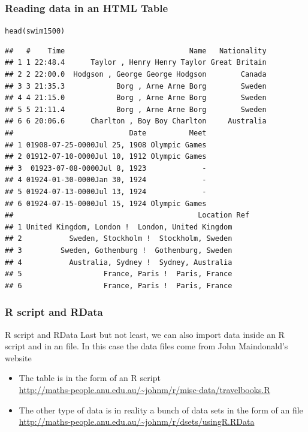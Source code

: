 \documentclass{beamer}\usepackage[]{graphicx}\usepackage[]{color}
\makeatletter
\newcommand{\hlstd}[1]{\textcolor[rgb]{0.196,0.196,0.196}{#1}}%
\newcommand{\hlkwd}[1]{\textcolor[rgb]{0.78,0.227,0.412}{#1}}%
\newenvironment{kframe}{%
 \def\at@end@of@kframe{}%
 \ifinner\ifhmode%
  \def\at@end@of@kframe{\end{minipage}}%
  \begin{minipage}{\columnwidth}%
 \fi\fi%
 \def\FrameCommand##1{\hskip\@totalleftmargin \hskip-\fboxsep
 \colorbox{shadecolor}{##1}\hskip-\fboxsep
     \hskip-\linewidth \hskip-\@totalleftmargin \hskip\columnwidth}%
 \MakeFramed {\advance\hsize-\width
   \@totalleftmargin\z@ \linewidth\hsize
   \@setminipage}}%
 {\par\unskip\endMakeFramed%
 \at@end@of@kframe}
\newenvironment{knitrout}{}{} %
\makeatother
\begin{document}
\begin{frame}[fragile]
\frametitle{Reading data in an HTML Table}

\begin{knitrout}\tiny
{}\color{fgcolor}\begin{kframe}
\begin{alltt}
\hlkwd{head}\hlstd{(swim1500)}
\end{alltt}
\begin{verbatim}
##   #    Time                             Name   Nationality
## 1 1 22:48.4      Taylor , Henry Henry Taylor Great Britain
## 2 2 22:00.0  Hodgson , George George Hodgson        Canada
## 3 3 21:35.3            Borg , Arne Arne Borg        Sweden
## 4 4 21:15.0            Borg , Arne Arne Borg        Sweden
## 5 5 21:11.4            Borg , Arne Arne Borg        Sweden
## 6 6 20:06.6      Charlton , Boy Boy Charlton     Australia
##                           Date          Meet
## 1 01908-07-25-0000Jul 25, 1908 Olympic Games
## 2 01912-07-10-0000Jul 10, 1912 Olympic Games
## 3  01923-07-08-0000Jul 8, 1923             -
## 4 01924-01-30-0000Jan 30, 1924             -
## 5 01924-07-13-0000Jul 13, 1924             -
## 6 01924-07-15-0000Jul 15, 1924 Olympic Games
##                                           Location Ref
## 1 United Kingdom, London !  London, United Kingdom    
## 2           Sweden, Stockholm !  Stockholm, Sweden    
## 3         Sweden, Gothenburg !  Gothenburg, Sweden    
## 4           Australia, Sydney !  Sydney, Australia    
## 5                   France, Paris !  Paris, France    
## 6                   France, Paris !  Paris, France
\end{verbatim}
\end{kframe}
\end{knitrout}

\end{frame}


\begin{frame}[fragile]
\frametitle{R script and RData}

\begin{block}{R script and RData}
Last but not least, we can also import data inside an R script and in an  file. In this case the data files come from John Maindonald's website 
 \begin{itemize}
  \item The table is in the form of an R script \\
{\scriptsize 
\url{http://maths-people.anu.edu.au/~johnm/r/misc-data/travelbooks.R}}
  \item The other type of data is in reality a bunch of data sets in the form of an  file \\
{\scriptsize 
\url{http://maths-people.anu.edu.au/~johnm/r/dsets/usingR.RData}}
 \end{itemize}
\end{block}

\end{frame}
\end{document}
